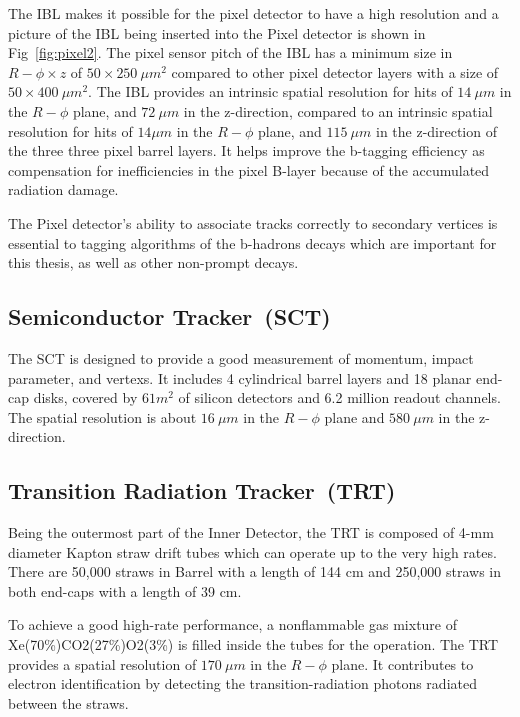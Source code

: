 \par The IBL makes it possible for the pixel detector to have a high resolution and a picture of the IBL being inserted into the Pixel detector is shown in 
Fig~\ref{fig:pixel2}. The pixel sensor pitch of the IBL has a minimum size in $R-\phi \times z$ of $50 \times 250~\mu m^2$ compared to other pixel detector layers with a size of $50 \times 400~\mu m^2$. 	 The IBL provides an intrinsic spatial resolution for hits of $14~\mu m$ in the $R-\phi$ plane, and
$72~\mu m$ in the z-direction, compared to an intrinsic spatial resolution for hits of $14\mu m$ in the $R-\phi$ plane, and $115~\mu m$ in the z-direction of the three three pixel barrel layers.
It helps improve the b-tagging efficiency as compensation for inefficiencies in the pixel B-layer because of the accumulated radiation damage.
\par The Pixel detector's ability to associate tracks correctly to secondary vertices is essential to tagging algorithms of the b-hadrons decays which are important for this thesis, as well as other non-prompt decays.
\subsection{Semiconductor Tracker~(SCT)}
The SCT \cite{AHMAD200798} is designed to provide a good measurement of momentum, impact parameter, and vertexs. It includes 4 cylindrical barrel layers and 18 planar end-cap disks, covered by $61 m^2$ of silicon detectors and 6.2 million readout channels. The spatial resolution is about $16~\mu m$ in the $R-\phi$ plane and $580~\mu m$ in the z-direction.

\subsection{Transition Radiation Tracker~(TRT)}


Being the outermost part of the Inner Detector, the TRT \cite{Abat:2008zza} is composed of 4-mm diameter Kapton straw drift tubes which can operate up to the very high rates. There are 50,000 straws in Barrel with a length of 144 cm and 250,000 straws in both end-caps with a length of 39 cm.

To achieve a good high-rate performance, a nonflammable gas mixture of Xe(70\%)CO2(27\%)O2(3\%) is filled inside the tubes for the operation. The TRT provides a spatial resolution of $170~\mu m$ in the $R-\phi$ plane. It contributes to electron identification by detecting the transition-radiation photons radiated between the straws. 

